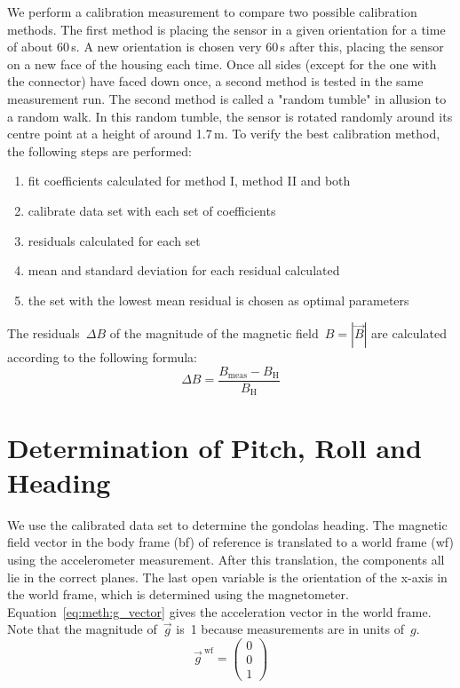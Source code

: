 We perform a calibration measurement to compare two possible calibration methods. The first method is placing the sensor in a given orientation for a time of about 60\,s. A new orientation is chosen very 60\,s after this, placing the sensor on a new face of the housing each time. Once all sides (except for the one with the connector) have faced down once, a second method is tested in the same measurement run. The second method is called a "random tumble" in allusion to a random walk. In this random tumble, the sensor is rotated randomly around its centre point at a height of around 1.7\,m. To verify the best calibration method, the following steps are performed:
\begin{enumerate}
    \item fit coefficients calculated for method I, method II and both
    \item calibrate data set with each set of coefficients
    \item residuals calculated for each set
    \item mean and standard deviation for each residual calculated
    \item the set with the lowest mean residual is chosen as optimal parameters
\end{enumerate}
The residuals~$\Delta B$ of the magnitude of the magnetic field~$B=|\vec{B}|$ are calculated according to the following formula:
\begin{equation}
    \Delta B=\frac{B_{\mathrm{meas}}-B_{\mathrm{H}}}{B_{\mathrm{H}}}
    \label{eq:residuals}
\end{equation}



\section{Determination of Pitch, Roll and Heading \label{sec:meth:determination_heading}}
We use the calibrated data set to determine the gondolas heading. The magnetic field vector in the body frame (bf) of reference is translated to a world frame (wf) using the accelerometer measurement. After this translation, the components all lie in the correct planes. The last open variable is the orientation of the x-axis in the world frame, which is determined using the magnetometer. Equation~\eqref{eq:meth:g_vector} gives the acceleration vector in the world frame. Note that the magnitude of~$\vec{g}$ is~1 because measurements are in units of~$g$.
\begin{equation}
    \vec{g}^{\ \mathrm{wf}}=\begin{pmatrix} 0 \\ 0 \\ 1 \end{pmatrix} \label{eq:meth:g_vector}
\end{equation}

